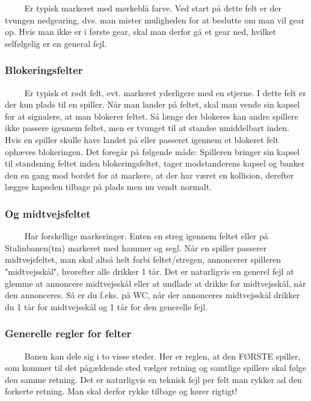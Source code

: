 \documentclass[12pt]{article}
\begin{document}
$\qquad$ Er typisk markeret med mørkeblå farve. Ved start på dette felt er der tvungen nedgearing, dvs. man mister muligheden for at beslutte om man vil gear op. Hvis man ikke er i første gear, skal man derfor gå et gear ned, hvilket selfølgelig er en general fejl.

\subsubsection*{Blokeringsfelter}

$\qquad$ Er typisk et rødt felt, evt. markeret yderligere med en stjerne. I dette felt er der kun plads til en spiller. Når man lander på feltet, skal man vende sin kapsel for at signalere, at man blokerer feltet. Så længe der blokeres kan andre spillere ikke passere igennem feltet, men er tvunget til at standse umiddelbart inden. Hvis en spiller skulle have landet på eller passeret igennem et blokeret felt ophæves blokeringen. Det foregår på følgende måde: Spilleren bringer sin kapsel til standsning feltet inden blokeringsfeltet, tager modstanderens kapsel og banker den en gang mod bordet for at markere, at der har været en kollision, derefter lægges kapselen tilbage på plads men nu vendt normalt.

\subsubsection*{Og midtvejsfeltet}
$\qquad$ Har forskellige markeringer. Enten en streg igennem feltet eller på Stalinbanen(tm) markeret med hammer og segl.
Når en spiller passerer midtvejsfeltet, man skal altså helt forbi feltet/stregen, annoncerer spilleren "midtvejsskål", hvorefter alle drikker 1 tår. Det er naturligvis en generel fejl at glemme at annoncere midtvejsskål eller at undlade at drikke for midtvejsskål, når den annonceres. Så er du f.eks. på WC, når der annonceres midtvejsskål drikker du 1 tår for midtvejsskål og 1 tår for den generelle fejl.

\subsubsection*{Generelle regler for felter}

$\qquad$ Banen kan dele sig i to visse steder. Her er reglen, at den FØRSTE spiller, som kommer til det pågældende sted vælger retning og samtlige spillere skal følge den samme retning. Det er naturligvis en teknisk fejl per felt man rykker ad den forkerte retning. Man skal derfor rykke tilbage og kører rigtigt!\\
\end{document}
